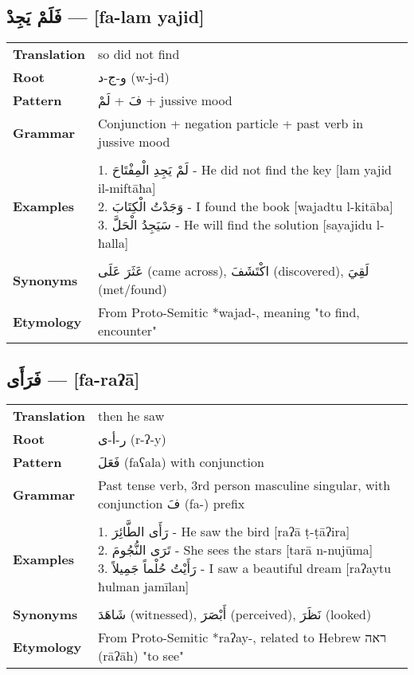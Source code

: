 \documentclass[letter,12pt]{article}
\begin{document}
\subsection{\textarabic{فَلَمْ يَجِدْ} — [fa-lam yajid]}
\begin{tabular}{p{3cm}p{10cm}}
\toprule
\textbf{Translation} & so did not find \\
\textbf{Root} & \textarabic{و-ج-د} (w-j-d) \\
\textbf{Pattern} & \textarabic{فَ} + \textarabic{لَمْ} + jussive mood \\
\textbf{Grammar} & Conjunction + negation particle + past verb in jussive mood \\
\midrule \\
\textbf{Examples} & \makecell[l]{\parbox{9.5cm}{
1. \textarabic{لَمْ يَجِدِ الْمِفْتَاحَ} - He did not find the key [lam yajid il-miftāħa]\\
2. \textarabic{وَجَدْتُ الْكِتَابَ} - I found the book [wajadtu l-kitāba]\\
3. \textarabic{سَيَجِدُ الْحَلَّ} - He will find the solution [sayajidu l-ħalla]
}} \\
\midrule \\
\textbf{Synonyms} & \textarabic{عَثَرَ عَلَى} (came across), \textarabic{اكْتَشَفَ} (discovered), \textarabic{لَقِيَ} (met/found) \\
\textbf{Etymology} & From Proto-Semitic *wajad-, meaning "to find, encounter" \\
\bottomrule
\end{tabular}

\subsection{\textarabic{فَرَأَى} — [fa-raʔā]}
\begin{tabular}{p{3cm}p{10cm}}
\toprule
\textbf{Translation} & then he saw \\
\textbf{Root} & \textarabic{ر-أ-ى} (r-ʔ-y) \\
\textbf{Pattern} & \textarabic{فَعَلَ} (faʕala) with conjunction \\
\textbf{Grammar} & Past tense verb, 3rd person masculine singular, with conjunction \textarabic{فَ} (fa-) prefix \\
\midrule \\
\textbf{Examples} & \makecell[l]{\parbox{9.5cm}{
1. \textarabic{رَأَى الطَّائِرَ} - He saw the bird [raʔā ṭ-ṭāʔira]\\
2. \textarabic{تَرَى النُّجُومَ} - She sees the stars [tarā n-nujūma]\\
3. \textarabic{رَأَيْتُ حُلْماً جَمِيلاً} - I saw a beautiful dream [raʔaytu ħulman jamīlan]
}} \\
\midrule \\
\textbf{Synonyms} & \textarabic{شَاهَدَ} (witnessed), \textarabic{أَبْصَرَ} (perceived), \textarabic{نَظَرَ} (looked) \\
\textbf{Etymology} & From Proto-Semitic *raʔay-, related to Hebrew \texthebrew{ראה} (rāʔāh) "to see" \\
\bottomrule
\end{tabular}
\end{document}
